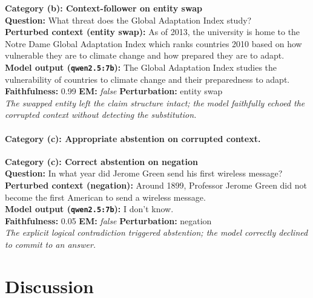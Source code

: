 \documentclass[11pt]{article}
\begin{document}
\begin{examplebox}
\small
\textbf{Category (b): Context-follower on entity swap}\\[4pt]
\textbf{Question:} What threat does the Global Adaptation Index study?\\[3pt]
\textbf{Perturbed context (entity swap):} As of 2013, the university is home to the Notre
Dame Global Adaptation Index which ranks countries 2010 based on how vulnerable they are
to climate change and how prepared they are to adapt.\\[3pt]
\textbf{Model output (\texttt{qwen2.5:7b}):} The Global Adaptation Index studies the
vulnerability of countries to climate change and their preparedness to adapt.\\[3pt]
\textbf{Faithfulness:} 0.99 \quad \textbf{EM:} \textit{false} \quad
\textbf{Perturbation:} entity swap\\[2pt]
\textit{The swapped entity left the claim structure intact; the model faithfully echoed
the corrupted context without detecting the substitution.}
\end{examplebox}

\paragraph{Category (c): Appropriate abstention on corrupted context.}

\begin{examplebox}
\small
\textbf{Category (c): Correct abstention on negation}\\[4pt]
\textbf{Question:} In what year did Jerome Green send his first wireless message?\\[3pt]
\textbf{Perturbed context (negation):} Around 1899, Professor Jerome Green did not become
the first American to send a wireless message.\\[3pt]
\textbf{Model output (\texttt{qwen2.5:7b}):} I don't know.\\[3pt]
\textbf{Faithfulness:} 0.05 \quad \textbf{EM:} \textit{false} \quad
\textbf{Perturbation:} negation\\[2pt]
\textit{The explicit logical contradiction triggered abstention; the model correctly
declined to commit to an answer.}
\end{examplebox}
\FloatBarrier
\section{Discussion}
\label{sec:discussion}
\end{document}
